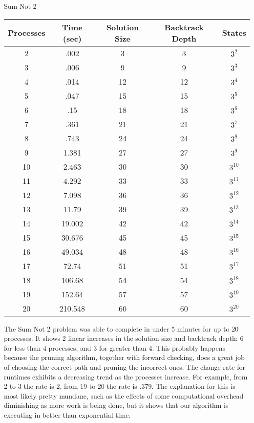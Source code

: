 \begin{center}
Sum Not 2 \\
\begin{tabular}{|c|c|c|c|c|}
\hline
 Processes & Time (sec) & Solution Size & Backtrack Depth & States \\
\hline
 2 & .002 & 3 & 3 & $3^{2}$               \\
 3 & .006 & 9 & 9 & $3^{3}$               \\
 4 & .014 & 12 & 12 & $3^{4}$             \\
 5 & .047 & 15 & 15 & $3^{5}$             \\
 6 & .15 & 18 & 18 & $3^{6}$              \\
 7 & .361 & 21 & 21 & $3^{7}$              \\
 8 & .743 & 24 & 24 & $3^{8}$             \\
 9 & 1.381 & 27 & 27 & $3^{9}$            \\
 10 & 2.463 & 30 & 30 & $3^{10}$          \\
 11 & 4.292 & 33 & 33 & $3^{11}$          \\
 12 & 7.098 & 36 & 36 & $3^{12}$          \\
 13 & 11.79 & 39 & 39 & $3^{13}$          \\
 14 & 19.002 & 42 & 42 & $3^{14}$         \\
 15 & 30.676 & 45 & 45 & $3^{15}$         \\
 16 & 49.034 & 48 & 48 & $3^{16}$         \\
 17 & 72.74 & 51 & 51 & $3^{17}$          \\
 18 & 106.68 & 54 & 54 & $3^{18}$          \\
 19 & 152.64 & 57 & 57 & $3^{19}$         \\
 20 & 210.548 & 60 & 60 & $3^{20}$        \\
\hline
\end{tabular}
\end{center}

The Sum Not 2 problem was able to complete in under 5 minutes for up to 20 processes.  It shows 2 linear
increases in the solution size and backtrack depth: 6 for less than 4 processes, and 3 for greater than
4.  This probably happens because the pruning algorithm, together with forward checking, does a great job
of choosing the correct path and pruning the incorrect ones.  The change rate for runtimes exhibits a 
decreasing trend as the processes increase.  For example, from 2 to 3 the rate is 2, from 19 to 20 the
rate is .379.  The explanation for this is most likely pretty mundane, such as the effects of some
computational overhead diminishing as more work is being done, but it shows that our algorithm is
executing in better than exponential time.   
 
